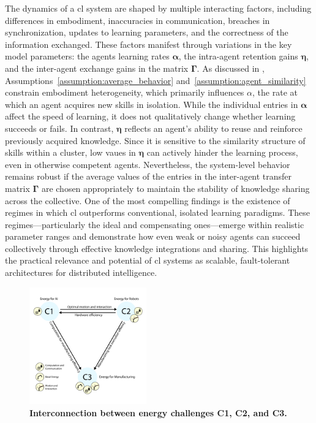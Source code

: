 \documentclass[12pt]{article}
\begin{document}
The dynamics of a \ac{cl} system are shaped by multiple interacting factors, including differences in embodiment, inaccuracies in communication, breaches in synchronization, updates to learning parameters, and the correctness of the information exchanged. These factors manifest through variations in the key model parameters: the agents learning rates $\bm{\alpha}$, the intra-agent retention gains $\bm{\eta}$, and the inter-agent exchange gains in the matrix $\bm{\Gamma}$. As discussed in , Assumptions~\ref{assumption:average_behavior} and~\ref{assumption:agent_similarity} constrain embodiment heterogeneity, which primarily influences $\alpha$, the rate at which an agent acquires new skills in isolation. While the individual entries in $\bm{\alpha}$ affect the speed of learning, it does not qualitatively change whether learning succeeds or fails. In contrast, $\bm{\eta}$ reflects an agent’s ability to reuse and reinforce previously acquired knowledge. Since it is sensitive to the similarity structure of skills within a cluster, low vaues in $\bm{\eta}$ can actively hinder the learning process, even in otherwise competent agents. Nevertheless, the system-level behavior remains robust if the average values of the entries in the inter-agent transfer matrix $\bm{\Gamma}$ are chosen appropriately to maintain the stability of knowledge sharing across the collective. One of the most compelling findings is the existence of regimes in which \ac{cl} outperforms conventional, isolated learning paradigms. These regimes---particularly the ideal and compensating ones---emerge within realistic parameter ranges and demonstrate how even weak or noisy agents can succeed collectively through effective knowledge integrations and sharing. This highlights the practical relevance and potential of \ac{cl} systems as scalable, fault-tolerant architectures for distributed intelligence.

\begin{figure}[!th]
	\centering
	\includegraphics[width=0.45\textwidth]{fig/grand_challenges_connections.png}
	\caption{\textbf{Interconnection between energy challenges C1, C2, and C3.}}
	\label{fig:challengesConnected}
\end{figure}
\end{document}
